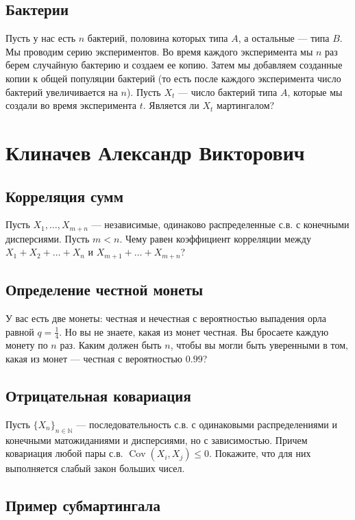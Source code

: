 \documentclass[12pt]{article}
\newcommand\N{\mathbb{N}}
\DeclareMathOperator{\Cov}{Cov}
\begin{document}
\subsection{Бактерии}

Пусть у нас есть $n$ бактерий, половина которых типа $A$, а остальные --- типа $B$. Мы проводим серию экспериментов. Во время каждого эксперимента мы $n$ раз берем случайную бактерию и создаем ее копию. Затем мы добавляем созданные копии к общей популяции бактерий (то есть после каждого эксперимента число бактерий увеличивается на $n$). Пусть $X_t$ --- число бактерий типа $A$, которые мы создали во время эксперимента $t$. Является ли $X_t$ мартингалом?


\newpage
\section{Клиначев Александр Викторович}

\subsection{Корреляция сумм}

Пусть $X_1, \dots, X_{m + n}$ --- независимые, одинаково распределенные с.в. с конечными дисперсиями. Пусть $m < n$. Чему равен коэффициент корреляции между $X_1 + X_2 + \dots + X_n$ и $X_{m + 1} + \dots + X_{m + n}$?

\subsection{Определение честной монеты}

У вас есть две монеты: честная и нечестная с вероятностью выпадения орла равной $q = \frac{1}{4}$. Но вы не знаете, какая из монет честная. Вы бросаете каждую монету по $n$ раз. Каким должен быть $n$, чтобы вы могли быть уверенными в том, какая из монет --- честная с вероятностью $0.99$? 


\subsection{Отрицательная ковариация}

Пусть $\{X_n\}_{n \in \N}$ --- последовательность с.в. с одинаковыми распределениями и конечными матожиданиями и дисперсиями, но с зависимостью. Причем ковариация любой пары с.в. $\Cov(X_i, X_j) \le 0$. Покажите, что для них выполняется слабый закон больших чисел.


\subsection{Пример субмартингала}
\end{document}

